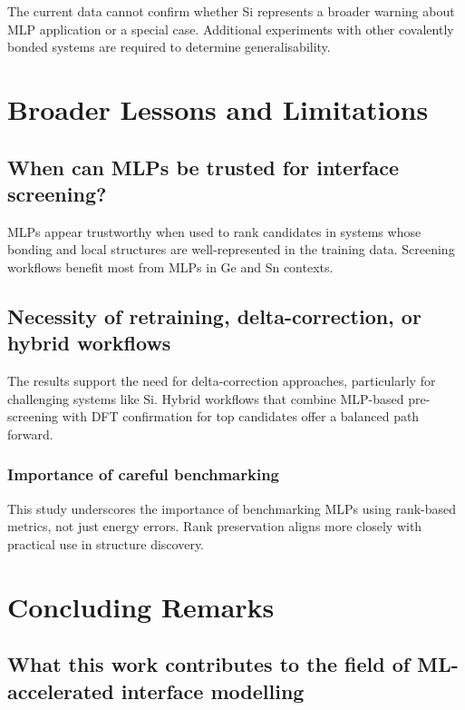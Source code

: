 The current data cannot confirm whether Si represents a broader warning about MLP application or a special case. Additional experiments with other covalently bonded systems are required to determine generalisability.

\section{Broader Lessons and Limitations} \label{section:broader_lessons_and_limitations}

\subsection{When can MLPs be trusted for interface screening?}

MLPs appear trustworthy when used to rank candidates in systems whose bonding and local structures are well-represented in the training data. Screening workflows benefit most from MLPs in Ge and Sn contexts.

\subsection{Necessity of retraining, delta-correction, or hybrid workflows}

The results support the need for delta-correction approaches, particularly for challenging systems like Si. Hybrid workflows that combine MLP-based pre-screening with DFT confirmation for top candidates offer a balanced path forward.


\subsubsection{Importance of careful benchmarking}

This study underscores the importance of benchmarking MLPs using rank-based metrics, not just energy errors. Rank preservation aligns more closely with practical use in structure discovery.

\section{Concluding Remarks} \label{section:concluding_remarks}

\subsection{What this work contributes to the field of ML-accelerated interface modelling}

